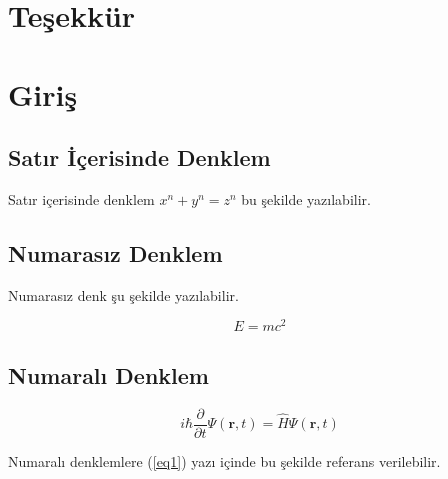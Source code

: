 \documentclass[12pt, a4paper]{article}
\begin{document}
\tableofcontents
\thispagestyle{empty}



\newpage
\setcounter{page}{1}
\begin{abstract}


\end{abstract}
\newpage
{}
\section*{\centering Teşekkür}
\newpage
{}
\setcounter{page}{1}
\section{Giriş}

\subsection{Satır İçerisinde Denklem}

\hspace{1cm}Satır içerisinde denklem \( x^n + y^n = z^n \) bu şekilde yazılabilir.

\subsection{Numarasız Denklem}

\hspace{1cm}Numarasız denk şu şekilde yazılabilir.

\begin{equation*}
E=mc^2 
\end{equation*}

\subsection{Numaralı Denklem}

\begin{equation} \label{eq1}
i\hbar \frac{\partial}{\partial t}\Psi(\mathbf{r},t) = \hat H \Psi(\mathbf{r},t)
\end{equation}

Numaralı denklemlere (\ref{eq1}) yazı içinde bu şekilde referans verilebilir.
\end{document}
